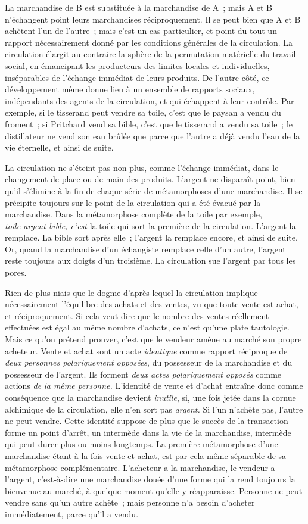 \documentclass[french,twoside]{book} %
\begin{document}
La marchandise de B est substituée à la marchandise de A ; mais A et B n’échangent point leurs marchandises réciproquement. Il se peut bien que A et B achètent l’un de l’autre ; mais c’est un cas particulier, et point du tout un rapport nécessairement donné par les conditions générales de la circulation. La circulation élargit au contraire la sphère de la permutation matérielle du travail social, en émancipant les producteurs des limites locales et individuelles, inséparables de l’échange immédiat de leurs produits. De l’autre côté, ce développement même donne lieu à un ensemble de rapports sociaux, indépendants des agents de la circulation, et qui échappent à leur contrôle. Par exemple, si le tisserand peut vendre sa toile, c’est que le paysan a vendu du froment ; si Pritchard vend sa bible, c’est que le tisserand a vendu sa toile ; le distillateur ne vend son eau brûlée que parce que l’autre a déjà vendu l’eau de la vie éternelle, et ainsi de suite.\par
La circulation ne s’éteint pas non plus, comme l’échange immédiat, dans le changement de place ou de main des produits. L’argent ne disparaît point, bien qu’il s’élimine à la fin de chaque série de métamorphoses d’une marchandise. Il se précipite toujours sur le point de la circulation qui a été évacué par la marchandise. Dans la métamorphose complète de la toile par exemple, \emph{toile‑argent‑bible, c’est} la toile qui sort la première de la circulation. L’argent la remplace. La bible sort après elle ; l’argent la remplace encore, et ainsi de suite. Or, quand la marchandise d’un échangiste remplace celle d’un autre, l’argent reste toujours aux doigts d’un troisième. La circulation sue l’argent par tous les pores.\par
Rien de plus niais que le dogme d’après lequel la circulation implique nécessairement l’équilibre des achats et des ventes, vu que toute vente est achat, et réciproquement. Si cela veut dire que le nombre des ventes réellement effectuées est égal au même nombre d’achats, ce n’est qu’une plate tautologie. Mais ce qu’on prétend prouver, c’est que le vendeur amène au marché son propre acheteur. Vente et achat sont un acte \emph{identique} comme rapport réciproque de \emph{deux personnes polariquement opposées}, du possesseur de la marchandise et du possesseur de l’argent. Ils forment \emph{deux actes polariquement opposés} comme actions \emph{de la même personne.} L’identité de vente et d’achat entraîne donc comme conséquence que la marchandise devient \emph{inutile}, si, une fois jetée dans la cornue alchimique de la circulation, elle n’en sort pas \emph{argent.} Si l’un n’achète pas, l’autre ne peut vendre. Cette identité suppose de plus que le succès de la transaction forme un point d’arrêt, un intermède dans la vie de la marchandise, intermède qui peut durer plus ou moins longtemps. La première métamorphose d’une marchandise étant à la fois vente et achat, est par cela même séparable de sa métamorphose complémentaire. L’acheteur a la marchandise, le vendeur a l’argent, c’est‑à‑dire une marchandise douée d’une forme qui la rend toujours la bienvenue au marché, à quelque moment qu’elle y réapparaisse. Personne ne peut vendre sans qu’un autre achète ; mais personne n’a besoin d’acheter immédiatement, parce qu’il a vendu.\par
\end{document}
